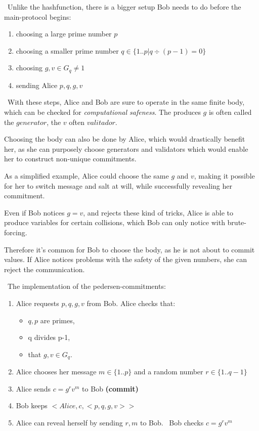 ~\newline Unlike the hashfunction, there is a bigger setup Bob needs to do before the main-protocol begins: 
	\begin{enumerate}
		\item choosing a large prime number $p$
		\item choosing a smaller prime number \newline $q \in \{1..p| q\div (p-1) = 0\}$
		\item choosing $g,v \in G_q \neq 1$
		\item sending Alice $p,q,g,v$ 
	\end{enumerate}
~\newline With these steps, Alice and Bob are sure to operate in the same finite body, which can be checked for \textit{computational safeness}. The produces $g$ is often called the $generator$, the $v$ often $valitador$.

Choosing the body can also be done by Alice, which would drastically benefit her, as she can purposely choose generators and validators which would enable her to construct non-unique commitments. 

As a simplified example, Alice could choose the same $g$ and $v$, making it possible for her to switch message and salt at will, while successfully revealing her commitment. 

Even if Bob notices $g=v$, and rejects these kind of tricks, Alice is able to produce variables for certain collisions, which Bob can only notice with brute-forcing. 

Therefore it's common for Bob to choose the body, as he is not about to commit values. If Alice notices problems with the safety of the given numbers, she can reject the communication.  

~\newline The implementation of the pedersen-commitments: 
	\begin{enumerate}
		\item Alice requests $p,q,g,v$ from Bob. \newline Alice checks that:
		\begin{itemize}
			\item $q,p$ are primes, 
			\item q divides p-1, 
			\item that $g,v \in G_q$. 
		\end{itemize}
		\item Alice chooses her message $m \in \{1..p\}$ and a random number $r \in \{1..q-1\}$
		\item Alice sends $c = g^rv^m$ to Bob \textbf{(commit)}
		\item Bob keeps $<Alice,c,<p,q,g,v>>$
		\item Alice can reveal herself by sending $r,m$ to Bob. ~\newline Bob checks $c = g^rv^m$
	\end{enumerate}

